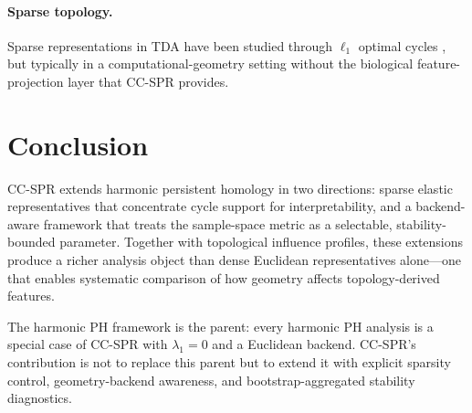 \documentclass[11pt]{article}
\begin{document}
\paragraph{Sparse topology.}
Sparse representations in TDA have been studied through $\ell_1$ optimal cycles \cite{chen2011hardness, dey2011optimal}, but typically in a computational-geometry setting without the biological feature-projection layer that CC-SPR provides.

\section{Conclusion}
\label{sec:conclusion}

CC-SPR extends harmonic persistent homology in two directions: sparse elastic representatives that concentrate cycle support for interpretability, and a backend-aware framework that treats the sample-space metric as a selectable, stability-bounded parameter.
Together with topological influence profiles, these extensions produce a richer analysis object than dense Euclidean representatives alone---one that enables systematic comparison of how geometry affects topology-derived features.

The harmonic PH framework is the parent: every harmonic PH analysis is a special case of CC-SPR with $\lambda_1 = 0$ and a Euclidean backend.
CC-SPR's contribution is not to replace this parent but to extend it with explicit sparsity control, geometry-backend awareness, and bootstrap-aggregated stability diagnostics.
\end{document}
